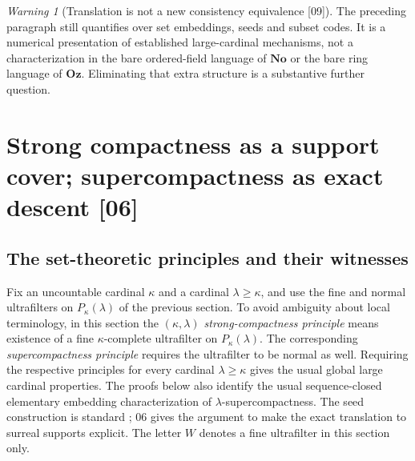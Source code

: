 \documentclass[11pt,letterpaper]{article}
\numberwithin{equation}{section}
\theoremstyle{definition}
\theoremstyle{remark}
\newcommand{\No}{\mathbf{No}}
\newcommand{\Oz}{\mathbf{Oz}}
\newtheorem{warning}[theorem]{Warning}
\newcommand{\src}[1]{\textup{\textsf{\small[#1]}}}%
\begin{document}
\begin{warning}[Translation is not a new consistency equivalence \src{09}]
The preceding paragraph still quantifies over set embeddings, seeds and
subset codes. It is a numerical presentation of established large-cardinal
mechanisms, not a characterization in the bare ordered-field language of
$\No$ or the bare ring language of $\Oz$. Eliminating that extra structure
is a substantive further question.
\end{warning}

\section{Strong compactness as a support cover; supercompactness as exact
descent \src{06}}\label{lce:cs:sec:compactness}

\subsection{The set-theoretic principles and their witnesses}
Fix an uncountable cardinal $\kappa$ and a cardinal $\lambda\ge\kappa$, and
use the fine and normal ultrafilters on $P_\kappa(\lambda)$ of the previous
section. To avoid ambiguity about local terminology, in this section the
\emph{$(\kappa,\lambda)$ strong-compactness principle} means existence of a
fine $\kappa$-complete ultrafilter on $P_\kappa(\lambda)$. The corresponding
\emph{supercompactness principle} requires the ultrafilter to be normal as
well. Requiring the respective principles for every cardinal
$\lambda\ge\kappa$ gives the usual global large cardinal properties. The
proofs below also identify the usual sequence-closed elementary embedding
characterization of $\lambda$-supercompactness. The seed construction is
standard \cite{Neeman,Williams}; 06 gives the argument to make the exact
translation to surreal supports explicit. The letter $W$ denotes a fine
ultrafilter in this section only.
\end{document}
